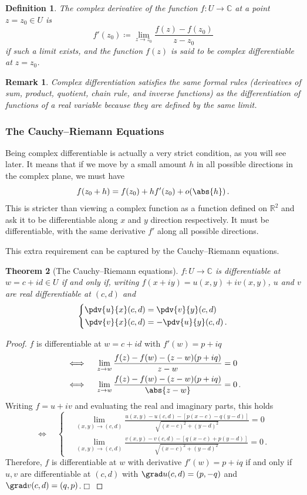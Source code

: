 \documentclass{article}
\theoremstyle{plain}\theoremheaderfont{\normalfont\itshape}\theorembodyfont{\rmfamily}\theoremseparator{.}\newtheorem*{rem}{Remark}\newtheorem*{ex}{Example}\newtheorem*{proof}{Proof}\newtheorem*{altp}{Alternative proof}
\theoremstyle{plain}\theoremheaderfont{\normalfont\bfseries}\theorembodyfont{\rmfamily}\theoremseparator{.}\newtheorem{thm}{Theorem}[section]\newtheorem{lem}[thm]{Lemma}\newtheorem{prop}[thm]{Proposition}\newtheorem*{cor}{Corollary}\newtheorem{defn}[thm]{Definition}\newtheorem{clm}[thm]{Claim}\newtheorem{clminproof}{Claim}
\theoremstyle{break}\theoremheaderfont{\normalfont\itshape}\theorembodyfont{\rmfamily}\theoremseparator{.\medskip}\newtheorem*{proofskip}{Proof}\newtheorem*{exs}{Examples}\newtheorem*{rems}{Remarks}
\theoremstyle{break}\theoremheaderfont{\normalfont\bfseries}\theorembodyfont{\rmfamily}\theoremseparator{.\medskip}\newtheorem{lemskip}[thm]{Lemma}\newtheorem{defnskip}[thm]{Definition}\newtheorem{propskip}[thm]{Proposition}\newtheorem{thmskip}[thm]{Theorem}
\numberwithin{equation}{section}
\newcommand{\qed}{\hfill\ensuremath{\Box}}
\begin{document}
	\begin{defn}
		The \textit{complex derivative} of the function \(f:U\to\mathbb{C}\) at a point \(z=z_0\in U\) is
		\[f'(z_0)\coloneqq\lim_{z\to z_0}\frac{f(z)-f(z_0)}{z-z_0}\]
		if such a limit exists, and the function \(f(z)\) is said to be \textit{complex differentiable} at \(z=z_0\).
	\end{defn}
	\begin{rem}
		Complex differentiation satisfies the same formal rules (derivatives of sum, product, quotient, chain rule, and inverse functions) as the differentiation of functions of a real variable because they are defined by the same limit.
	\end{rem}
	\subsubsection{The Cauchy--Riemann Equations}
	Being complex differentiable is actually a very strict condition, as you will see later. It means that if we move by a small amount \(h\) in all possible directions in the complex plane, we must have
	\[f(z_0+h)=f(z_0)+h f'(z_0) + o(\abs{h})\,.\]
	This is stricter than viewing a complex function as a function defined on \(\mathbb{R}^2\) and ask it to be differentiable along \(x\) and \(y\) direction respectively. It must be differentiable, with the same derivative \(f'\) along all possible directions.

	This extra requirement can be captured by the Cauchy--Riemann equations.
	\begin{thm}[The Cauchy--Riemann equations]		
		\(f:U\to\mathbb{C}\) is differentiable at \(w=c+id\in U\) if and only if, writing \(f(x+iy)=u(x,y)+iv(x,y)\), \(u\) and \(v\) are real differentiable at \((c,d)\) and
		\[\left\{\begin{aligned}
			\pdv{u}{x}(c,d)&=\pdv{v}{y}(c,d)\\
			\pdv{v}{x}(c,d)&=-\pdv{u}{y}(c,d)\,.
		\end{aligned}\right.\]
	\end{thm}
	\begin{proof}
		\(f\) is differentiable at \(w=c+id\) with \(f'(w)=p+iq\)
		\begin{align*}
			&\iff\quad\lim_{z\to w}\frac{f(z)-f(w)-(z-w)(p+iq)}{z-w}=0\\
			&\iff\quad\lim_{z\to w}\frac{f(z)-f(w)-(z-w)(p+iq)}{\abs{z-w}}=0\,.
		\end{align*}
		Writing \(f=u+iv\) and evaluating the real and imaginary parts, this holds
		\[\iff\quad\left\{\begin{aligned}
			&\lim_{(x,y)\to(c,d)}\frac{u(x,y)-u(c,d)-[p(x-c)-q(y-d)]}{\sqrt{(x-c)^2+(y-d)^2}}=0\\
			&\lim_{(x,y)\to(c,d)}\frac{v(x,y)-v(c,d)-[q(x-c)+p(y-d)]}{\sqrt{(x-c)^2+(y-d)^2}}=0\,.
		\end{aligned}\right.\]
		Therefore, \(f\) is differentiable at \(w\) with derivative \(f'(w)=p+iq\) if and only if \(u,v\) are differentiable at \((c,d)\) with \(\grad u(c,d)=(p,-q)\) and \(\grad v(c,d) = (q,p)\).\qed
	\end{proof}
\end{document}
